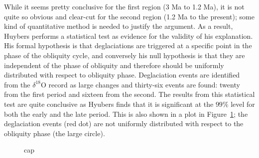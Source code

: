 \documentclass[11pt]{article}
\begin{document}
While it seems pretty conclusive for the first region (3 Ma to 1.2 Ma), it is not quite so obvious and clear-cut for the second region (1.2 Ma to the present); some kind of quantitative method is needed to justify the argument.
As a result, Huybers performs a statistical test as evidence for the validity of his explanation\cite{huybers}. 
His formal hypothesis is that deglaciations are triggered at a specific point in the phase of the obliquity cycle, and conversely his null hypothesis is that they are independent of the phase of obliquity and therefore should be uniformly distributed with respect to obliquity phase.
Deglaciation events are identified from the $\delta^{18}$O record as large changes and thirty-six events are found: twenty from the first period and sixteen from the second.
The results from this statistical test are quite conclusive as Hyubers finds that it is significant at the $99\%$ level for both the early and the late period.
This is also shown in a plot in Figure~\ref{hypotest}; the deglaciation events (red dot) are not uniformly distributed with respect to the obliquity phase (the large circle).

\begin{figure}
  \centering
  \caption{cap}
  \label{hypotest}
\end{figure}
\end{document}
